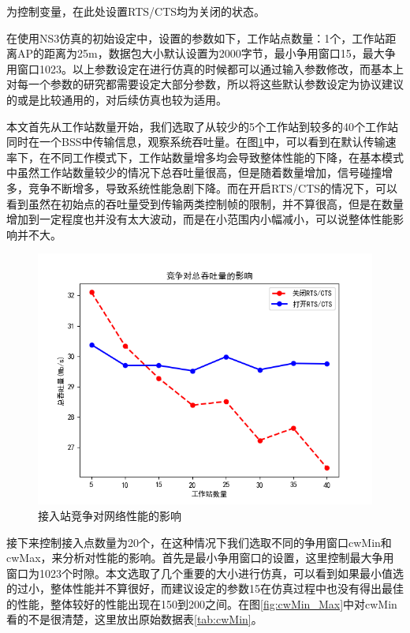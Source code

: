 \documentclass{article}
\begin{document}
为控制变量，在此处设置RTS/CTS均为关闭的状态。

在使用NS3仿真的初始设定中，设置的参数如下，工作站点数量：1个，工作站距离AP的距离为25m，数据包大小默认设置为2000字节，最小争用窗口15，最大争用窗口1023。以上参数设定在进行仿真的时候都可以通过输入参数修改，而基本上对每一个参数的研究都需要设定大部分参数，所以将这些默认参数设定为协议建议的或是比较通用的，对后续仿真也较为适用。

本文首先从工作站数量开始，我们选取了从较少的5个工作站到较多的40个工作站同时在一个BSS中传输信息，观察系统吞吐量。在图\ref{fig:contention}中，可以看到在默认传输速率下，在不同工作模式下，工作站数量增多均会导致整体性能的下降，在基本模式中虽然工作站数量较少的情况下总吞吐量很高，但是随着数量增加，信号碰撞增多，竞争不断增多，导致系统性能急剧下降。而在开启RTS/CTS的情况下，可以看到虽然在初始点的吞吐量受到传输两类控制帧的限制，并不算很高，但是在数量增加到一定程度也并没有太大波动，而是在小范围内小幅减小，可以说整体性能影响并不大。
\begin{figure}[ht]
	\centering
	\includegraphics[scale=0.6]{picture/contention.png}
	\caption{接入站竞争对网络性能的影响}
	\label{fig:contention}
\end{figure}

接下来控制接入点数量为20个，在这种情况下我们选取不同的争用窗口cwMin和cwMax，来分析对性能的影响。首先是最小争用窗口的设置，这里控制最大争用窗口为1023个时隙。本文选取了几个重要的大小进行仿真，可以看到如果最小值选的过小，整体性能并不算很好，而建议设定的参数15在仿真过程中也没有得出最佳的性能，整体较好的性能出现在150到200之间。在图\ref{fig:cwMin_Max}中对cwMin看的不是很清楚，这里放出原始数据表\ref{tab:cwMin}。
\end{document}
